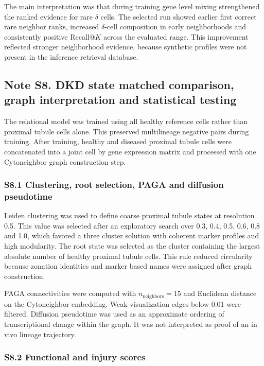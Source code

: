 \documentclass[11pt]{article}
\begin{document}
The main interpretation was that during training gene level mixing strengthened the ranked evidence for rare \(\delta\) cells. The selected run showed earlier first correct rare neighbor ranks, increased \(\delta\)-cell composition in early neighborhoods and consistently positive Recall@\(K\) across the evaluated range. This improvement reflected stronger neighborhood evidence, because synthetic profiles were not present in the inference retrieval database.

\subsection*{Note S8. DKD state matched comparison, graph interpretation and statistical testing}

The relational model was trained using all healthy reference cells rather than proximal tubule cells alone. This preserved multilineage negative pairs during training. After training, healthy and diseased proximal tubule cells were concatenated into a joint cell by gene expression matrix and processed with one Cytoneighbor graph construction step.

\subsubsection*{S8.1 Clustering, root selection, PAGA and diffusion pseudotime}

Leiden clustering was used to define coarse proximal tubule states at resolution 0.5. This value was selected after an exploratory search over 0.3, 0.4, 0.5, 0.6, 0.8 and 1.0, which favored a three cluster solution with coherent marker profiles and high modularity. The root state was selected as the cluster containing the largest absolute number of healthy proximal tubule cells. This rule reduced circularity because zonation identities and marker based names were assigned after graph construction.

PAGA connectivities were computed with \(n_{\mathrm{neighbors}}=15\) and Euclidean distance on the Cytoneighbor embedding. Weak visualization edges below 0.01 were filtered. Diffusion pseudotime was used as an approximate ordering of transcriptional change within the graph. It was not interpreted as proof of an in vivo lineage trajectory.

\subsubsection*{S8.2 Functional and injury scores}
\end{document}
